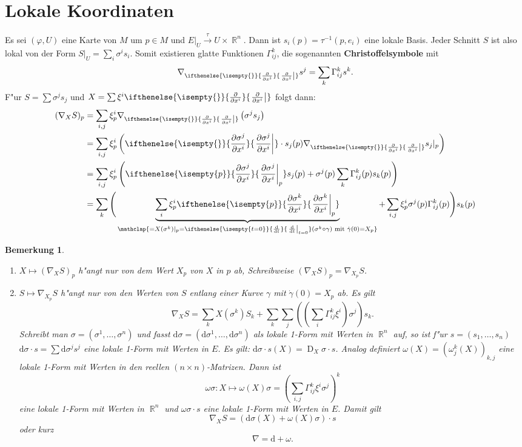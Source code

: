 \documentclass[paper=A4, twoside, chapterprefix=true, bibliography=totoc, headsepline]{scrbook}
\let\temp\phi{}
\let\phi\varphi{}
\let\varphi\temp{}
\let\temp\theta{}
\let\theta\vartheta{}
\let\vartheta\temp{}
\let\temp\epsilon{}
\let\epsilon\varepsilon{}
\let\varepsilon\temp{}
\let\temp\rho{}
\let\rho\varrho{}
\let\varrho\temp{}
\DeclareMathOperator{\R}{\mathbb{R}}
\DeclareMathOperator{\D}{D}         %
\newcommand{\dop}{\mathrm{d}}
\newcommand{\X}{\times}
\newcommand{\difffrac}[3][]{\ifthenelse{\isempty{#1}}{\frac{\dop #2}{\dop #3}}{\left. \frac{\dop #2}{\dop #3} \right|_{#1}}}
\newcommand{\pdifffrac}[3][]{\ifthenelse{\isempty{#1}}{\frac{\partial #2}{\partial #3}}{\left. \frac{\partial #2}{\partial #3} \right|_{#1}}}
\theoremstyle{plain}
\theoremstyle{nonumberplain}
\newtheorem{bem}{Bemerkung}
\theoremstyle{empty}
\theoremstyle{break}
\newcommand{\CmIndex}[2][]{\ifthenelse{\isempty{#1}}{\index{#2}}{\index{#1}}#2}
\newcommand{\CmMark}[2][]{\textbf{\CmIndex[#1]{#2}}}
\begin{document}
\section{Lokale Koordinaten}

Es sei $(\phi, U)$ eine Karte von $M$ um $p \in M$ und $E|_U \overset{\tau}{\to} U \X \R^n$. Dann ist $s_i(p) = \tau^{-1}(p, e_i)$ eine lokale Basis.
Jeder Schnitt $S$ ist also lokal von der Form $S|_U = \sum_i \sigma^{i} s_i$.
Somit existieren glatte Funktionen $\Gamma_{ij}^k$, die sogenannten \CmMark{Christoffelsymbole} mit 
\[ \nabla_{\pdifffrac{}{x^{i}}} s^j = \sum_k \Gamma_{ij}^k s^k. \]
F"ur $S = \sum \sigma^j s_j$ und $X = \sum \xi^{i} \pdifffrac{}{x^{i}}$ folgt dann:
\begin{align*}
  (\nabla_XS)_p &= \sum_{i,j} \xi_p^{i} \nabla_{\pdifffrac{}{x^{i}}} \left(\sigma^j s_j\right)\\
  &= \sum_{i,j} \xi_p^{i} \left(\pdifffrac{\sigma^j}{x^{i}} \cdot s_j(p) \nabla_{\pdifffrac{}{x^{i}}} s_j|_p\right)\\
  &= \sum_{i,j} \xi_p^{i} \left(\pdifffrac[p]{\sigma^j}{x^{i}} s_j(p) + \sigma^j(p) \sum_k \Gamma_{ij}^k(p) s_k(p)\right)\\
  &= \sum_k \Bigg(\underbrace{\sum_i \xi_p^{i} \pdifffrac[p]{\sigma^k}{x^{i}}}_{\mathclap{= X(\sigma^k)|_p = \difffrac[t=0]{}{t} (\sigma^k \circ \gamma) \text{ mit } \dot\gamma(0) = X_p}} + \sum_{i,j} \xi_p^{i} \sigma^j(p) \Gamma_{ij}^k(p)\Bigg) s_k(p)
\end{align*}

\begin{bem}
  \begin{enumerate}[label=(\arabic*),leftmargin=*]
  \item $X \mapsto (\nabla_XS)_p$ h"angt nur von dem Wert $X_p$ von  $X$ in $p$ ab, Schreibweise $(\nabla_XS)_p = \nabla_{X_p}S$.
  \item $S \mapsto \nabla_{X_p}S$ h"angt nur von den Werten von $S$ entlang einer Kurve $\gamma$ mit $\dot\gamma(0) = X_p$ ab.
    Es gilt
    \[ \nabla_XS = \sum_k X(\sigma^k)S_k + \sum_k \sum_j\left(\left(\sum_i \Gamma_{ij}^k \xi^{i}\right) \sigma^j\right) s_k. \]
    Schreibt man $\sigma = (\sigma^1,\ldots ,\sigma^n)$ und fasst $\dop \sigma = (\dop \sigma^1,\ldots ,\dop \sigma^n)$ als lokale 1-Form mit Werten in $\R^n$ auf, so ist f"ur $s=(s_1,\ldots ,s_n)$ $\dop\sigma \cdot s = \sum \dop \sigma^j s^j$ eine lokale 1-Form mit Werten in $E$. Es gilt: $\dop \sigma \cdot s(X) = \D_X \sigma \cdot s$.
    Analog definiert $\omega(X) = (\omega_j^k(X))_{k,j}$ eine lokale 1-Form mit Werten in den reellen $(n\X n)$-Matrizen.
    Dann ist 
    \[ \omega \sigma : X \mapsto \omega(X) \sigma = \left( \sum_{i,j} \Gamma_{ij}^k \xi^{i} \sigma^j \right)^k \]
    eine lokale 1-Form mit Werten in $\R^n$ und $\omega\sigma \cdot s$ eine lokale 1-Form mit Werten in $E$. Damit gilt
    \[ \nabla_XS = (\dop \sigma(X) + \omega(X) \sigma) \cdot s \]
    oder kurz
    \[ \nabla = \dop + \omega. \]
  \end{enumerate}
\end{bem}
\end{document}
